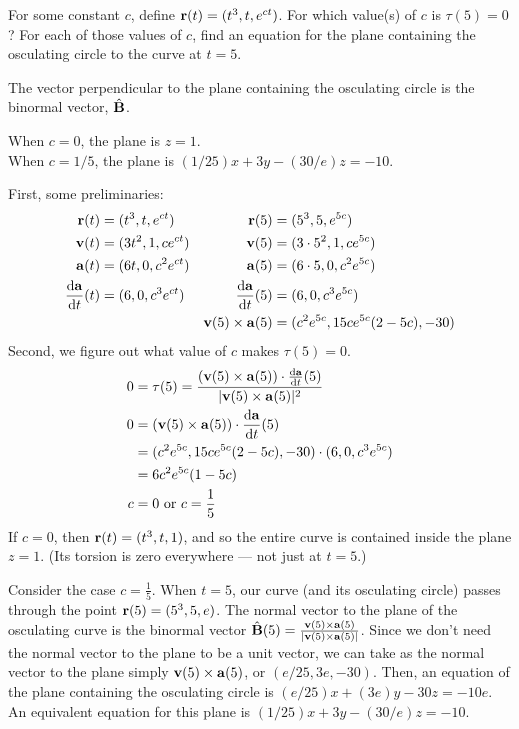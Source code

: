 \begin{question}
	For some constant $c$, define $\mathbf{r}(t)=(t^3,t,e^{ct})$. For which value(s) of $c$ is $\tau(5)=0$? For each of those values of $c$, find an equation for the plane containing the osculating circle to the curve at $t=5$.
\end{question}
\begin{hint}
	The vector perpendicular to the plane containing the osculating circle is the binormal vector, $\hat{\mathbf{B}}$.
\end{hint}
\begin{answer}
	When $c=0$, the plane is $z=1$.\\
	When $c=1/5$, the plane is $(1/25)x+3y-(30/e)z=-10$.
\end{answer}
\begin{solution}
	First, some preliminaries:
	\begin{align*}
		\vr(t)&=(t^3,t,e^{ct}) & \vr(5)&=(5^3,5,e^{5c})\\
		\vv(t)&=(3t^2,1,ce^{ct}) & \vv(5)&=(3\cdot 5^2,1,ce^{5c})\\
		\va(t)&=(6t,0,c^2e^{ct}) & \va(5)&=(6\cdot 5,0,c^2e^{5c})	\\
		\diff{\va}{t}(t)&=	(6,0,c^3e^{ct})& 	\diff{\va}{t}(5)&=	(6,0,c^3e^{5c})\\
	&&	\vv(5) \times \va(5)&=(c^2e^{5c},15ce^{5c}(2-5c),-30)
		\end{align*}
	Second, we figure out what value of $c$ makes $\tau(5)=0$.
	\begin{align*}
		0&=\tau(5)=\dfrac{(\vv(5) \times \va(5))\cdot\diff{\va}{t}(5)}{|\vv(5) \times \va(5)|^2}\\
		0&=(\vv(5)\times\va(5))\cdot \diff{\va}{t}(5)\\
		&=(c^2e^{5c},15ce^{5c}(2-5c),-30)\cdot (6,0,c^3e^{5c})\\
		&=6c^2e^{5c}(1-5c)\\
		c&=0 \text{ or } c=\frac15
		\end{align*}
	If $c=0$, then $\mathbf{r}(t)=(t^3,t,1)$, and so the entire curve is contained inside the plane $z=1$. (Its torsion is zero everywhere --- not just at $t=5$.)
	
	Consider the case $c=\frac15$. When $t=5$, our curve (and its osculating circle) passes through the point $\mathbf{r}(5)=(5^3,5,e)$. The normal vector to the plane of the osculating curve is the binormal vector $\hat{\mathbf{B}}(5)=\frac{\mathbf{v}(5)\times \mathbf{a}(5)}{|\mathbf{v}(5)\times \mathbf{a}(5)|}$. Since we don't need the normal vector to the plane to be a unit vector, we can take as the normal vector to the plane simply $\mathbf{v}(5) \times \mathbf{a}(5)$, or $(e/25,3e,-30)$. Then, an equation of the plane containing the osculating circle is $(e/25)x+(3e)y-30z=-10e$. An equivalent equation for this plane is $(1/25)x+3y-(30/e)z=-10$.
\end{solution}

